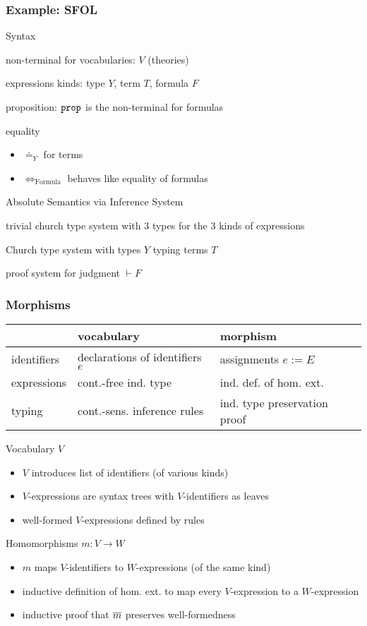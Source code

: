 \begin{frame}\frametitle{Example: SFOL}
\begin{blockitems}{Syntax}
\item non-terminal for vocabularies: $V$ (theories)
\item expressions kinds: type $Y$, term $T$, formula $F$
\item proposition: $\prop$ is the non-terminal for formulas
\item equality 
 \begin{itemize}
 \item $\doteq_Y$ for terms
 \item $\Leftrightarrow_{\mathrm{Formula}}$ behaves like equality of formulas
 \end{itemize}
\end{blockitems}

\begin{blockitems}{Absolute Semantics via Inference System}
\item trivial church type system with $3$ types for the $3$ kinds of expressions
\item Church type system with types $Y$ typing terms $T$
\item proof system for judgment $\vdash F$
\end{blockitems}
\end{frame}

\begin{frame}\frametitle{Morphisms}
\begin{center}
\begin{tabular}{l|l|l}
            & vocabulary & morphism \\
\hline
identifiers     & declarations of identifiers $e$ & assignments $e:=E$ \\
expressions & cont.-free ind. type & ind. def. of hom. ext.\\
typing & cont.-sens. inference rules    & ind. type preservation proof\\
\end{tabular}
\end{center}

Vocabulary $V$
\begin{itemize}
\item $V$ introduces list of identifiers (of various kinds)
\item $V$-expressions are syntax trees with $V$-identifiers as leaves
\item well-formed $V$-expressions defined by rules
\end{itemize}

Homomorphisms $m:V\to W$
\begin{itemize}
\item $m$ maps $V$-identifiers to $W$-expressions (of the same kind)
\item inductive definition of hom. ext. to map every $V$-expression to a $W$-expression
\item inductive proof that $\overline{m}$ preserves well-formedness
\end{itemize}
\end{frame}

